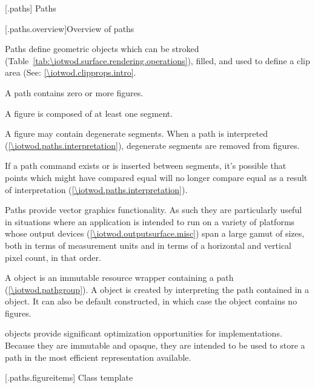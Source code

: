 
 [\iotwod.paths] {Paths}

 [\iotwod.paths.overview]{Overview of paths}

\pnum
Paths define geometric objects which can be stroked (Table~\ref{tab:\iotwod.surface.rendering.operations}), filled, and used to define a clip area (See: \ref{\iotwod.clipprops.intro}.

\pnum
A path contains zero or more figures.

\pnum
A figure is composed of at least one segment.

\pnum
A figure may contain degenerate segments. When a path is interpreted (\ref{\iotwod.paths.interpretation}), degenerate segments are removed from figures.
\begin{note}
If a path command exists or is inserted between segments, it's possible that points which might have compared equal will no longer compare equal as a result of interpretation (\ref{\iotwod.paths.interpretation}).
\end{note}

\pnum
Paths provide vector graphics functionality. As such they are particularly useful in situations where an application is intended to run on a variety of platforms whose output devices (\ref{\iotwod.outputsurface.misc}) span a large gamut of sizes, both in terms of measurement units and in terms of a horizontal and vertical pixel count, in that order.

\pnum
A  object is an immutable resource wrapper containing a path (\ref{\iotwod.pathgroup}). A  object is created by interpreting the path contained in a  object. It can also be default constructed, in which case the  object contains no figures.
\begin{note}
 objects provide significant optimization opportunities for implementations. Because they are immutable and opaque, they are intended to be used to store a path in the most efficient representation available.
\end{note}



 [\iotwod.paths.figureitems] {Class template }

\addtocounter{SectionDepthBase}{2}















\addtocounter{SectionDepthBase}{-2}

\addtocounter{SectionDepthBase}{1}


\addtocounter{SectionDepthBase}{-1}
